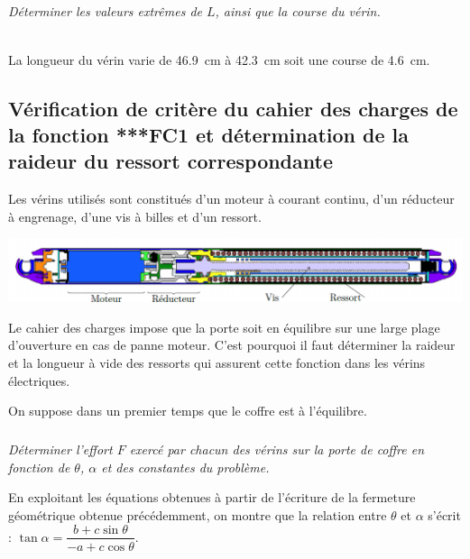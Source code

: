 \documentclass[10pt,fleqn]{article} %
\begin{document}
\begin{multicols}{2}
\begin{multicols}{2}
\subparagraph{}
\textit{Déterminer les valeurs extrêmes de $L$, ainsi que la course du vérin.}
\ifprof
\begin{corrige}~\\
La longueur du vérin varie de \SI{46,9}{cm} à \SI{42,3}{cm} soit une course de \SI{4,6}{cm}. 
\end{corrige}
\else
\fi


\subsection*{Vérification de critère du cahier des charges de la fonction ***FC1 et détermination de la
raideur du ressort correspondante}

Les vérins utilisés sont constitués d’un moteur à courant continu, d’un réducteur à engrenage, d’une vis à billes et d’un ressort.

\begin{center}
\includegraphics[width=\linewidth]{images/fig_02}
\end{center}

Le cahier des charges impose que la porte soit en équilibre sur une large plage d’ouverture en cas de panne
moteur. C’est pourquoi il faut déterminer la raideur et la longueur à vide des ressorts qui assurent cette fonction
dans les vérins électriques.

On suppose dans un premier temps que le coffre est à l’équilibre.

\subparagraph{}
\textit{Déterminer l’effort $F$ exercé par chacun des vérins sur la porte de coffre en fonction de $\theta$, $\alpha$ et des constantes du problème.}
\ifprof
{}
\else
\fi

En exploitant les équations obtenues à partir de l’écriture de la fermeture géométrique obtenue précédemment, on montre que la relation entre $\theta$ et $\alpha$ s’écrit : 
$ \tan \alpha = $.


\end{multicols}
\end{multicols}
\end{document}

